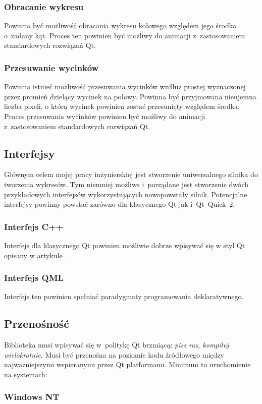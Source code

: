 \documentclass[11pt,twoside,a4paper,final]{article}
\begin{document}
\subsubsection{Obracanie wykresu}
Powinna być możliwość obracania wykresu kołowego względem jego środka o~zadany kąt. Proces ten powinien być możliwy do animacji z~zastosowaniem standardowych rozwiązań Qt.

\subsubsection{Przesuwanie wycinków}
Powinna istnieć możliwość przesuwania wycinków wzdłuż prostej wyznaczonej przez promień dzielący wycinek na połowy. Powinna być przyjmowana nieujemna liczba pixeli, o którą wycinek powinien zostać przesunięty względem środka. Proces przesuwania wycinków powinien być możliwy do animacji z~zastosowaniem standardowych rozwiązań Qt.
 
\subsection{Interfejsy}
Głównym celem mojej pracy inżynierskiej jest stworzenie uniwersalnego silnika do tworzenia wykresów. Tym niemniej możliwe i~porządane jest stworzenie dwóch przykładowych interfejsów wykorzystujących nowopowstały silnik. Potencjalne interfejsy powinny powstać zarówno dla klasycznego Qt jak i~Qt~Quick~2. 

\subsubsection{Interfejs C++}
Interfejs dla klasycznego Qt powinien możliwie dobrze wpisywać się w styl Qt opisany w artykule~\cite{qt-style-API}.

\subsubsection{Interfejs QML}
Interfejs ten powinien spełniać paradygmaty programowania deklaratywnego.

\subsection{Przenośność}
Biblioteka musi wpisywać się w~politykę Qt brzmiącą: \textit{pisz raz, kompiluj wielokrotnie}. Musi być przenośna na poziomie kodu źródłowego między najważniejszymi wspieranymi przez Qt platformami.
Minimum to uruchomienie na systemach:
\subsubsection{Windows NT}
\end{document}
